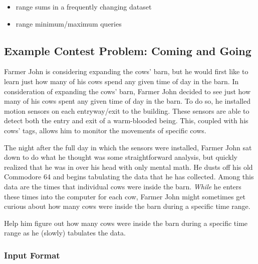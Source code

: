 \begin{itemize}
    \item range sums in a frequently changing dataset
    \item range minimum/maximum queries
\end{itemize}

\subsection{Example Contest Problem: Coming and Going}

Farmer John is considering expanding the cows' barn, but he would first like to learn just how many of his cows spend any given time of day in the barn.
In consideration of expanding the cows' barn, Farmer John decided to see just how many of his cows spent any given time of day in the barn.
To do so, he installed motion sensors on each entryway/exit to the building.
These sensors are able to detect both the entry and exit of a warm-blooded being.
This, coupled with his cows' tags, allows him to monitor the movements of specific cows.

The night after the full day in which the sensors were installed, Farmer John sat down to do what he thought was some straightforward analysis, but quickly realized that he was in over his head with only mental math.
He dusts off his old Commodore 64 and begins tabulating the data that he has collected.
Among this data are the times that individual cows were inside the barn.
\textit{While} he enters these times into the computer for each cow, Farmer John might sometimes get curious about how many cows were inside the barn during a specific time range.

Help him figure out how many cows were inside the barn during a specific time range as he (slowly) tabulates the data.

\subsubsection{Input Format}

